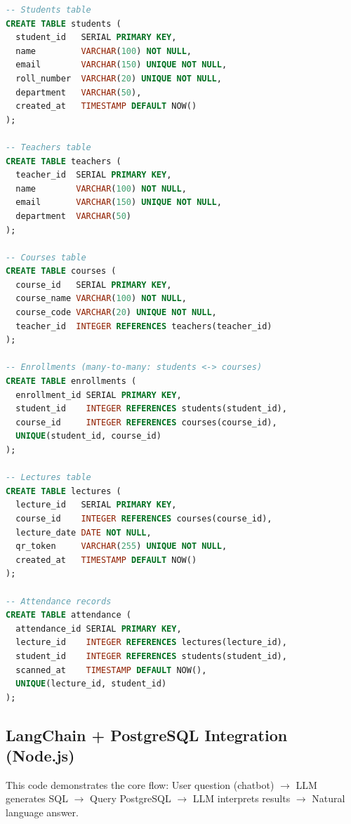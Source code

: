 \documentclass[11pt,a4paper]{article}
\begin{document}
\begin{lstlisting}[language=SQL, caption={PostgreSQL Schema for ClassQR}]
-- Students table
CREATE TABLE students (
  student_id   SERIAL PRIMARY KEY,
  name         VARCHAR(100) NOT NULL,
  email        VARCHAR(150) UNIQUE NOT NULL,
  roll_number  VARCHAR(20) UNIQUE NOT NULL,
  department   VARCHAR(50),
  created_at   TIMESTAMP DEFAULT NOW()
);

-- Teachers table
CREATE TABLE teachers (
  teacher_id  SERIAL PRIMARY KEY,
  name        VARCHAR(100) NOT NULL,
  email       VARCHAR(150) UNIQUE NOT NULL,
  department  VARCHAR(50)
);

-- Courses table
CREATE TABLE courses (
  course_id   SERIAL PRIMARY KEY,
  course_name VARCHAR(100) NOT NULL,
  course_code VARCHAR(20) UNIQUE NOT NULL,
  teacher_id  INTEGER REFERENCES teachers(teacher_id)
);

-- Enrollments (many-to-many: students <-> courses)
CREATE TABLE enrollments (
  enrollment_id SERIAL PRIMARY KEY,
  student_id    INTEGER REFERENCES students(student_id),
  course_id     INTEGER REFERENCES courses(course_id),
  UNIQUE(student_id, course_id)
);

-- Lectures table
CREATE TABLE lectures (
  lecture_id   SERIAL PRIMARY KEY,
  course_id    INTEGER REFERENCES courses(course_id),
  lecture_date DATE NOT NULL,
  qr_token     VARCHAR(255) UNIQUE NOT NULL,
  created_at   TIMESTAMP DEFAULT NOW()
);

-- Attendance records
CREATE TABLE attendance (
  attendance_id SERIAL PRIMARY KEY,
  lecture_id    INTEGER REFERENCES lectures(lecture_id),
  student_id    INTEGER REFERENCES students(student_id),
  scanned_at    TIMESTAMP DEFAULT NOW(),
  UNIQUE(lecture_id, student_id)
);
\end{lstlisting}

\subsection{LangChain + PostgreSQL Integration (Node.js)}

This code demonstrates the core flow:
User question (chatbot) $\to$ LLM generates SQL $\to$ Query PostgreSQL $\to$ LLM interprets results $\to$ Natural language answer.
\end{document}
